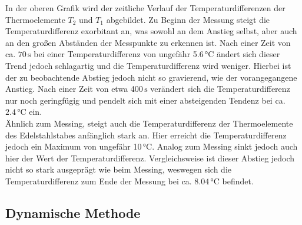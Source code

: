 In der oberen Grafik wird der zeitliche Verlauf der Temperaturdifferenzen der Thermoelemente $T_2$ und $T_1$ abgebildet.
Zu Beginn der Messung steigt die Temperaturdifferenz exorbitant an, was sowohl an dem Anstieg selbst, aber auch an den 
großen Abständen der Messpunkte zu erkennen ist. Nach einer Zeit von ca. $70\,\unit{\second}$ bei einer Temperaturdifferenz von ungefähr 5.6\,\unit{\celsius} ändert sich dieser Trend jedoch
schlagartig und die Temperaturdifferenz wird weniger. Hierbei ist der zu beobachtende Abstieg jedoch nicht so gravierend, wie
der vorangegangene Anstieg. Nach einer Zeit von etwa 400\,$\unit{\second}$ verändert sich die Temperaturdifferenz nur noch 
geringfügig und pendelt sich mit einer absteigenden Tendenz bei ca. $2.4\,\unit{\celsius}$ ein.\\
Ähnlich zum Messing, steigt auch die Temperaturdifferenz der Thermoelemente des Edelstahlstabes anfänglich stark an. Hier erreicht die 
Temperaturdifferenz jedoch ein Maximum von ungefähr 10\,$\unit{\celsius}$. Analog zum Messing sinkt jedoch auch hier der Wert der 
Temperaturdifferenz. Vergleichsweise ist dieser Abstieg jedoch nicht so stark ausgeprägt wie beim Messing, weswegen sich die Temperaturdifferenz
zum Ende der Messung bei ca. $8.04\,\unit{\celsius}$ befindet.

\subsection{Dynamische Methode}

